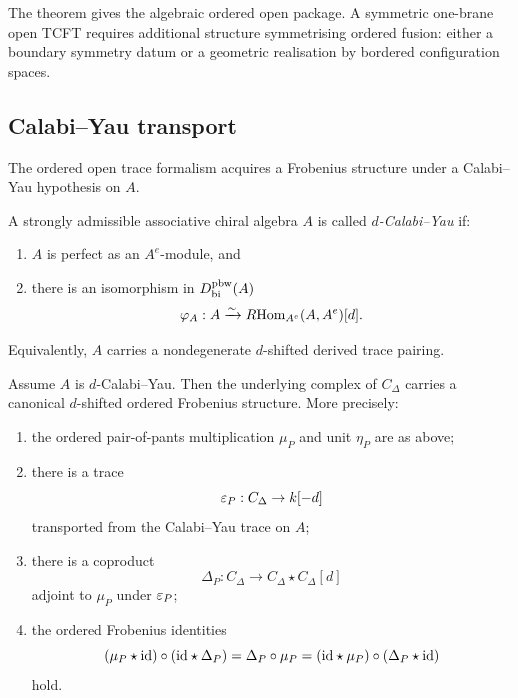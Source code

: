 \begin{remark}
The theorem gives the algebraic ordered open package. A symmetric
one-brane open TCFT requires additional structure symmetrising ordered
fusion: either a boundary symmetry datum or a geometric realisation by
bordered configuration spaces.
\end{remark}

\subsection{Calabi--Yau transport}

The ordered open trace formalism acquires a Frobenius structure under a Calabi--Yau hypothesis on
$A$.

\begin{definition}
A strongly admissible associative chiral algebra $A$ is called \emph{$d$-Calabi--Yau} if:
\begin{enumerate}[label=(\alph*)]
\item $A$ is perfect as an $A^e$-module, and
\item there is an isomorphism in $D^{\mathrm{pbw}}_{\mathrm{bi}}(A)$
\[
\varphi_A:A\xrightarrow{\sim}R\!\operatorname{Hom}_{A^e}(A,A^e)[d].
\]
\end{enumerate}
Equivalently, $A$ carries a nondegenerate $d$-shifted derived trace pairing.
\end{definition}

\begin{theorem}
\ClaimStatusProvedHere
\label{thm:CY}
Assume $A$ is $d$-Calabi--Yau. Then the underlying complex of $C_\Delta$ carries a canonical
$d$-shifted ordered Frobenius structure. More precisely:
\begin{enumerate}[label=(\roman*)]
\item the ordered pair-of-pants multiplication $\mu_P$ and unit $\eta_P$ are as above;
\item there is a trace
\[
\varepsilon_P:C_\Delta\to k[-d]
\]
transported from the Calabi--Yau trace on $A$;
\item there is a coproduct
\[
\Delta_P:C_\Delta\to C_\Delta\star C_\Delta[d]
\]
adjoint to $\mu_P$ under $\varepsilon_P$;
\item the ordered Frobenius identities
\[
(\mu_P\star \mathrm{id})\circ(\mathrm{id}\star \Delta_P)
=
\Delta_P\circ \mu_P
=
(\mathrm{id}\star\mu_P)\circ(\Delta_P\star \mathrm{id})
\]
hold.
\end{enumerate}
\end{theorem}

